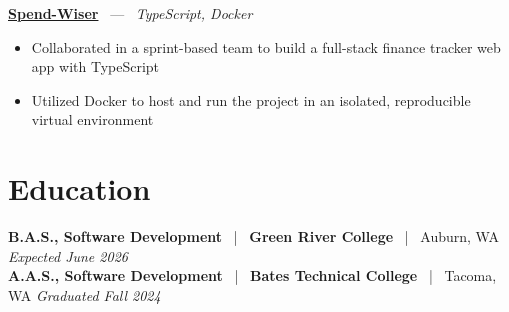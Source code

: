 \documentclass[10pt, letterpaper]{article}
\newcommand{\jobhead}[4]{%
  \vspace{5pt}%
  {\bfseries\color{dark}#1}%
  ~{\color{light}|}~%
  {\bfseries\color{navy}#2}%
  ~{\color{light}|}~%
  {\color{light}#3}%
  \hfill{\color{light}\small\textit{#4}}\\[-2pt]%
}
\newcommand{\projhead}[3]{%
  \vspace{5pt}%
  {\bfseries\color{dark}\href{#2}{#1}}%
  ~{\color{light}---}~%
  {\color{light}\small\textit{#3}}\\[-2pt]%
}
\begin{document}
\projhead{Spend-Wiser}{https://github.com/JesseChum/w26-sdev372-spendwiser-finance-tracker}{TypeScript, Docker}
\begin{itemize}
  \item Collaborated in a sprint-based team to build a full-stack finance tracker web app with TypeScript
  \item Utilized Docker to host and run the project in an isolated, reproducible virtual environment
\end{itemize}

\section{Education}

\jobhead{B.A.S., Software Development}{Green River College}{Auburn, WA}{Expected June 2026}
\jobhead{A.A.S., Software Development}{Bates Technical College}{Tacoma, WA}{Graduated Fall 2024}
\end{document}
